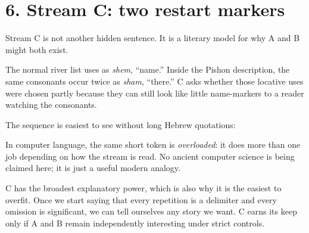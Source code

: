 \section*{6. Stream C: two restart markers}

Stream C is not another hidden sentence. It is a literary model for why A and B might both exist.

The normal river list uses  as \textit{shem}, ``name.'' Inside the Pishon description, the same consonants occur twice as \textit{sham}, ``there.'' C asks whether those locative uses were chosen partly because they can still look like little name-markers to a reader watching the consonants.

The sequence is easiest to see without long Hebrew quotations:


In computer language, the same short token is \emph{overloaded}: it does more than one job depending on how the stream is read. No ancient computer science is being claimed here; it is just a useful modern analogy.

C has the broadest explanatory power, which is also why it is the easiest to overfit. Once we start saying that every repetition is a delimiter and every omission is significant, we can tell ourselves any story we want. C earns its keep only if A and B remain independently interesting under strict controls.

